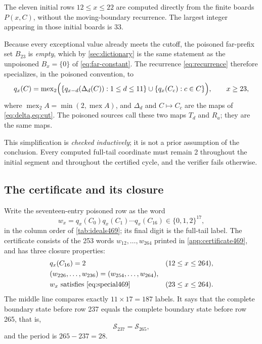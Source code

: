 \documentclass[11pt,letterpaper]{article}
\numberwithin{equation}{section}
\theoremstyle{definition}
\theoremstyle{remark}
\newcommand{\mex}{\operatorname{mex}}
\newcommand{\pmex}{\operatorname{mex}_{2}}
\begin{document}
The eleven initial rows $12\leq x\leq22$ are computed directly from the
finite boards $P(x,C)$, without the moving-boundary recurrence. The
largest integer appearing in those initial boards is 33.

Because every exceptional value already meets the cutoff, the poisoned
far-prefix set $B_{23}$ is \emph{empty}, which by \cref{sec:dictionary}
is the same statement as the unpoisoned $B_x=\{0\}$ of
\cref{eq:far-constant}. The recurrence \cref{eq:recurrence} therefore
specializes, in the poisoned convention, to
\begin{equation}\label{eq:special469}
 q_x(C)=\pmex\Bigl(
   \{q_{x-d}(\Delta_d(C)):1\leq d\leq11\}
   \cup\{q_x(C_c):c\in C\}\Bigr),
 \qquad x\geq23,
\end{equation}
where $\pmex A=\min(2,\mex A)$, and $\Delta_d$ and $C\mapsto C_c$ are the
maps of \cref{eq:delta,eq:cut}. The poisoned sources call these two maps
$T_d$ and $R_a$; they are the same maps.

This simplification is \emph{checked inductively}; it is not a prior
assumption of the conclusion. Every computed full-tail coordinate must
remain 2 throughout the initial segment and throughout the certified
cycle, and the verifier fails otherwise.

\subsection{The certificate and its closure}
\label{sec:certificate469}

Write the seventeen-entry poisoned row as the word
\[
 w_x=q_x(C_0)q_x(C_1)\cdots q_x(C_{16})\in\{0,1,2\}^{17},
\]
in the column order of \cref{tab:ideals469}; its final digit is the
full-tail label. The certificate consists of the 253 words
$w_{12},\ldots,w_{264}$ printed in \cref{app:certificate469}, and has
three closure properties:
\begin{equation}\label{eq:closure469}
\begin{aligned}
 &q_x(C_{16})=2 &&(12\leq x\leq264),\\
 &(w_{226},\ldots,w_{236})=(w_{254},\ldots,w_{264}),&&\\
 &w_x\ \text{satisfies \cref{eq:special469}} &&(23\leq x\leq264).
\end{aligned}
\end{equation}
The middle line compares exactly $11\times17=187$ labels. It says that
the complete boundary state before row 237 equals the complete boundary
state before row 265, that is,
\begin{equation}\label{eq:repeat469}
 \boxed{\mathscr S_{237}=\mathscr S_{265},}
\end{equation}
and the period is $265-237=28$.
\end{document}

